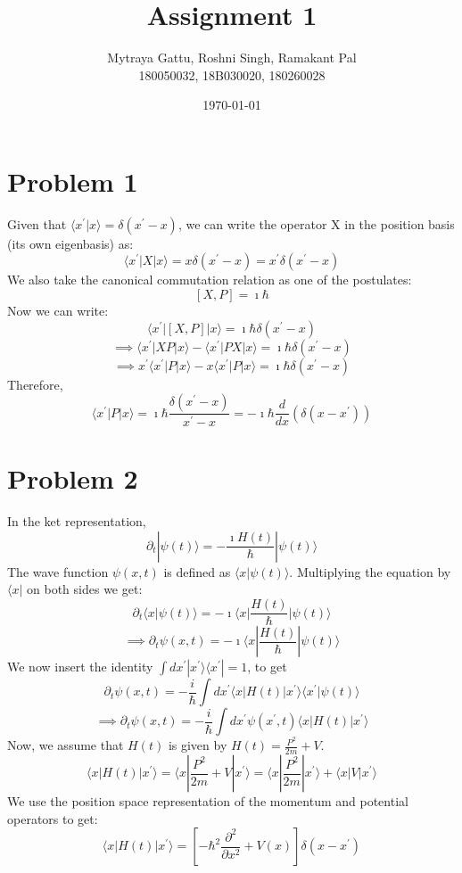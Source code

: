 \documentclass{article}
\title{Assignment 1}
\author{Mytraya Gattu, Roshni Singh, Ramakant Pal\\ 180050032, 18B030020, 180260028}
\date{\today}
\begin{document}
\maketitle

\section*{Problem 1}
Given that $\langle x^{\prime}|x \rangle = \delta(x^{\prime}-x)$, we can write the operator X in the position basis (its own eigenbasis) as:
$$\langle x^{\prime} | X | x \rangle = x\delta\left(x^{\prime}-x\right)= x^{\prime}\delta\left(x^{\prime}-x\right)$$ We also take the canonical commutation relation as one of the postulates: $$\left[X,P\right] = \imath \hbar$$
Now we can write:
$$\langle x^{\prime} | \left[X,P\right] | x \rangle = \imath \hbar \delta\left(x^{\prime}-x\right)$$
$$\implies \langle x^{\prime} | XP| x \rangle - \langle x^{\prime} | PX| x \rangle = \imath \hbar \delta\left(x^{\prime}-x\right)$$
$$\implies x^{\prime}\langle x^{\prime} | P| x \rangle-x\langle x^{\prime} | P| x \rangle=\imath \hbar \delta\left(x^{\prime}-x\right)$$
Therefore, 
$$\langle x^{\prime} | P| x \rangle = \imath \hbar \frac{\delta\left(x^{\prime}-x\right)}{x^{\prime}-x} = -\imath \hbar \frac{d}{dx}\left(\delta \left(x-x^{\prime}\right) \right)$$
\section*{Problem 2}
In the ket representation, 
$$\partial_{t} |\psi(t) \rangle = -\frac{\imath H(t)}{\hbar} | \psi (t) \rangle$$
The wave function $\psi (x,t) $ is defined as $\langle x | \psi (t) \rangle$.
Multiplying the equation by $\langle x|$ on both sides we get:
$$\partial_{t} \langle x|\psi(t) \rangle = -\imath \langle x | \frac{H(t)}{\hbar} | \psi (t) \rangle$$
$$\implies \partial_{t} \psi(x,t) = -\imath \langle x | \frac{H(t)}{\hbar} | \psi (t) \rangle$$
We now insert the identity $\int dx^{\prime} | x^{\prime} \rangle \langle x^{\prime} | = 1$, to get
$$\partial_{t}\psi(x,t)=-\frac{i}{\hbar}\int dx^{\prime} \langle x | H(t) | x^{\prime} \rangle \langle x^{\prime}|\psi (t) \rangle$$
$$\implies \partial_{t}\psi(x,t)=-\frac{i}{\hbar}\int dx^{\prime} \psi(x^{\prime},t) \langle x | H(t) | x^{\prime} \rangle$$
Now, we assume that $H(t)$ is given by $H(t) = \frac{P^2}{2m} + V$.
$$ \langle x | H(t) | x^{\prime} \rangle =  \langle x | \frac{P^2}{2m} + V | x^{\prime} \rangle = \langle x | \frac{P^2}{2m}  | x^{\prime} \rangle + \langle x | V  | x^{\prime} \rangle$$
We use the position space representation of  the momentum and potential operators to get:
$$ \langle x | H(t) | x^{\prime} \rangle =  [-\hbar^2 \frac{\partial^2}{\partial x^2} + V(x) ] \delta(x-x^{\prime})$$
\end{document}
